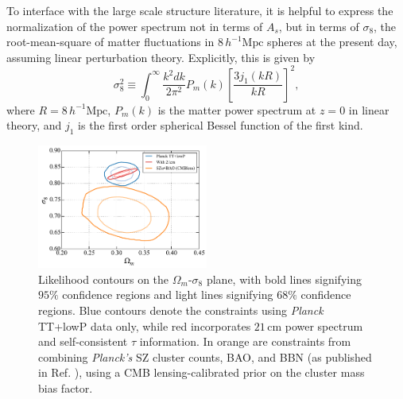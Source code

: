 \documentclass[twocolumn,aps,prd,nofootinbib,showpacs,superscriptaddress]{revtex4-1}
\begin{document}
To interface with the large scale structure literature, it is helpful to express the normalization of the power spectrum not in terms of $A_s$, but in terms of $\sigma_8$, the root-mean-square of matter fluctuations in $8\,h^{-1}\textrm{Mpc}$ spheres at the present day, assuming linear perturbation theory. Explicitly, this is given by
\begin{equation}
\sigma_8^2 \equiv \int_0^\infty \frac{k^2 dk}{2 \pi^2} P_m (k) \left[ \frac{3 j_1 (kR)}{kR}\right]^2,
\end{equation}
where $R= 8\,h^{-1}\textrm{Mpc}$, $P_m(k)$ is the matter power spectrum at $z=0$ in linear theory, and $j_1$ is the first order spherical Bessel function of the first kind.

\begin{figure}[!]
\centering
\includegraphics[width=0.5\textwidth]{figures/omegamsigma8.pdf}
\caption{Likelihood contours on the $\Omega_m$-$\sigma_8$ plane, with bold lines signifying $95\%$ confidence regions and light lines signifying $68\%$ confidence regions. Blue contours denote the constraints using \emph{Planck} TT+lowP data only, while red incorporates $21\,\textrm{cm}$ power spectrum and self-consistent $\tau$ information. In orange are constraints from combining \emph{Planck's} SZ cluster counts, BAO, and BBN (as published in Ref. \cite{Planck2015clusters}), using a CMB lensing-calibrated prior on the cluster mass bias factor.}
\label{fig:omegamsigma8}
\end{figure}
\end{document}
